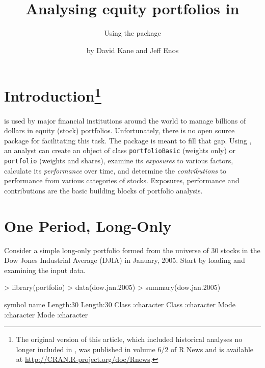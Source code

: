 \documentclass[a4paper]{report}
\begin{document}
\begin{article}
\title{Analysing equity portfolios in \R{}}
\subtitle{Using the  package}
\author{by David Kane and Jeff Enos}



\maketitle


\section*{Introduction\footnote{The original version of this article, which included historical analyses no longer included in , was published in volume 6/2 of R News and is available at \url{http://CRAN.R-project.org/doc/Rnews}.}}

\R{} is used by major financial institutions around the world to
manage billions of dollars in equity (stock) portfolios.
Unfortunately, there is no open source \R{} package for facilitating
this task. The  package is meant to fill that gap.
Using , an analyst can create an object of class
\texttt{portfolioBasic} (weights only) or \texttt{portfolio} (weights
and shares), examine its \emph{exposures} to various factors,
calculate its \emph{performance} over time, and determine the
\emph{contributions} to performance from various categories of stocks.
Exposures, performance and contributions are the basic building blocks
of portfolio analysis.

\section*{One Period, Long-Only}

Consider a simple long-only portfolio formed from the universe of 30
stocks in the Dow Jones Industrial Average (DJIA) in January, 2005.
Start by loading and examining the input data.

\begin{Schunk}
\begin{Sinput}
> library(portfolio)
> data(dow.jan.2005)
> summary(dow.jan.2005)
\end{Sinput}
\begin{Soutput}
    symbol              name          
 Length:30          Length:30         
 Class :character   Class :character  
 Mode  :character   Mode  :character  
                                      

\end{Soutput}
\end{Schunk}
\end{article}
\end{document}
